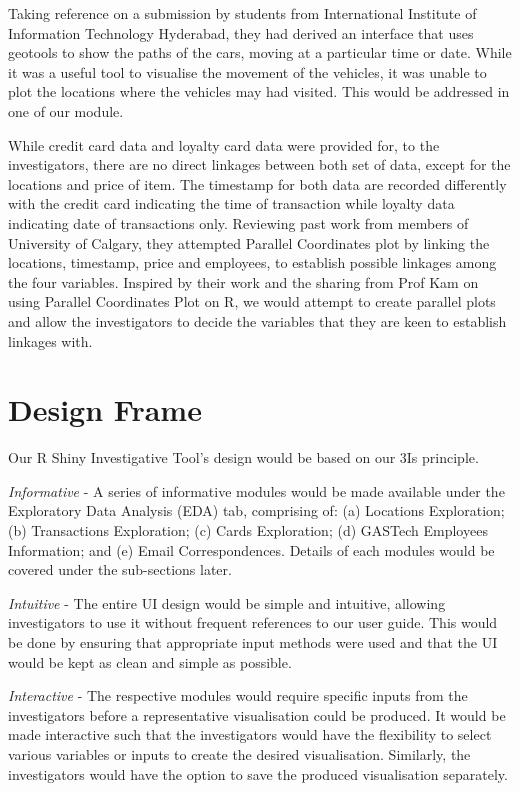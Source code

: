 \documentclass{acm_proc_article-sp}
\begin{document}
Taking reference on a submission by students from International
Institute of Information Technology Hyderabad, they had derived an
interface that uses geotools to show the paths of the cars, moving at a
particular time or date. While it was a useful tool to visualise the
movement of the vehicles, it was unable to plot the locations where the
vehicles may had visited. This would be addressed in one of our module.

While credit card data and loyalty card data were provided for, to the
investigators, there are no direct linkages between both set of data,
except for the locations and price of item. The timestamp for both data
are recorded differently with the credit card indicating the time of
transaction while loyalty data indicating date of transactions only.
Reviewing past work from members of University of Calgary, they
attempted Parallel Coordinates plot by linking the locations, timestamp,
price and employees, to establish possible linkages among the four
variables. Inspired by their work and the sharing from Prof Kam on using
Parallel Coordinates Plot on R, we would attempt to create parallel
plots and allow the investigators to decide the variables that they are
keen to establish linkages with.

\hypertarget{design-frame}{%
\section{Design Frame}\label{design-frame}}

Our R Shiny Investigative Tool's design would be based on our 3Is
principle.

\emph{Informative} - A series of informative modules would be made
available under the Exploratory Data Analysis (EDA) tab, comprising of:
(a) Locations Exploration; (b) Transactions Exploration; (c) Cards
Exploration; (d) GASTech Employees Information; and (e) Email
Correspondences. Details of each modules would be covered under the
sub-sections later.

\emph{Intuitive} - The entire UI design would be simple and intuitive,
allowing investigators to use it without frequent references to our user
guide. This would be done by ensuring that appropriate input methods
were used and that the UI would be kept as clean and simple as possible.

\emph{Interactive} - The respective modules would require specific
inputs from the investigators before a representative visualisation
could be produced. It would be made interactive such that the
investigators would have the flexibility to select various variables or
inputs to create the desired visualisation. Similarly, the investigators
would have the option to save the produced visualisation separately.
\end{document}
